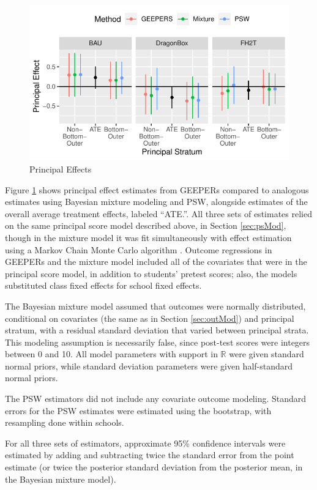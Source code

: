 \documentclass{statsoc} %
\begin{document}
\begin{figure}
  \centering
  \includegraphics{../figure/compareMethods.pdf}
  \caption{Principal Effects}
  \label{fig:compare}
\end{figure}

Figure \ref{fig:compare} shows principal effect estimates from GEEPERs compared to analogous estimates using Bayesian mixture modeling and PSW, alongside estimates of the overall average treatment effects, labeled ``ATE.''.
All three sets of estimates relied on the same principal score model described above, in Section \ref{sec:psMod}, though in the mixture model it was fit simultaneously with effect estimation using a Markov Chain Monte Carlo algorithm \citep{rstan}.
Outcome regressions in GEEPERs and the mixture model included all of the covariates that were in the principal score model, in addition to students' pretest scores; also, the models substituted class fixed effects for school fixed effects. 

The Bayesian mixture model assumed that outcomes were normally distributed, conditional on covariates (the same as in Section \ref{sec:outMod}) and principal stratum, with a residual standard deviation that varied between principal strata. This modeling assumption is necessarily false, since post-test scores were integers between 0 and 10. All model parameters with support in $\mathbb{R}$ were given standard normal priors, while standard deviation parameters were given half-standard normal priors.

The PSW estimators did not include any covariate outcome modeling. Standard errors for the PSW estimates were estimated using the bootstrap, with resampling done within schools.

For all three sets of estimators, approximate 95\% confidence intervals were estimated by adding and subtracting twice the standard error from the point estimate (or twice the posterior standard deviation from the posterior mean, in the Bayesian mixture model).
\end{document}
